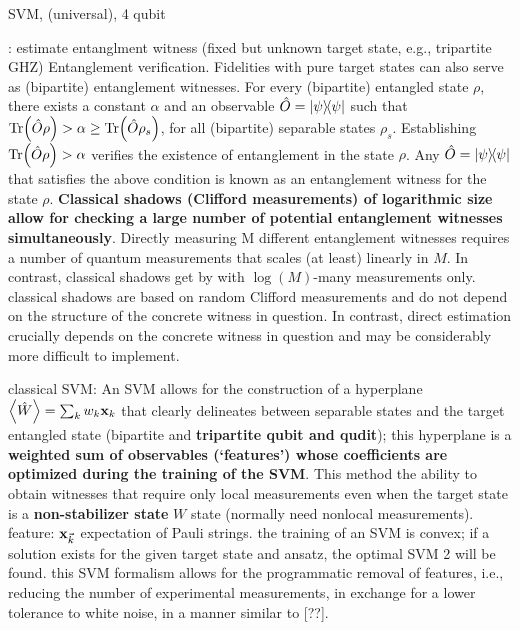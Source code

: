 \documentclass[
10pt,
aps,
pra,
linenumbers,
floatfix,
]{revtex4-2}
\theoremstyle{plain}
\theoremstyle{definition}
\newcommand{\ew}{\hat{W}}
\newcommand{\ob}{\hat{O}}
\newcommand{\dm}{\rho}
\begin{document}
SVM, (universal), 4 qubit \cite{vintskevichClassificationFourqubitEntangled2022}

{} \cite{huangPredictingManyProperties2020}: estimate entanglment witness (fixed but unknown target state, e.g., tripartite GHZ)
Entanglement verification. Fidelities with pure target states can also serve as (bipartite) entanglement witnesses. For every (bipartite) entangled state $\dm$, there exists a constant $\alpha$ and an observable $\ob = \op{\psi}$ such that $\Tr(\ob \dm ) > \alpha \ge \Tr(\ob \dm_s )$, for all (bipartite) separable states $\dm_s$. Establishing $\Tr(\ob \dm ) > \alpha$ verifies the existence of entanglement in the state $\dm$. Any $\ob = \op{\psi}$ that satisfies the above condition is known as an entanglement witness for the state $\dm$. 
\textbf{Classical shadows (Clifford measurements) of logarithmic size allow for checking a large number of potential entanglement witnesses simultaneously}.
Directly measuring M diﬀerent entanglement witnesses requires a number of quantum measurements that scales (at least) linearly in $M$. In contrast, classical shadows get by with $\log(M)$-many measurements only.
classical shadows are based on random Clifford measurements and do not depend on the structure of the concrete witness in question. In contrast, direct estimation crucially depends on the concrete witness in question and may be considerably more diﬃcult to implement.

classical SVM: An SVM allows for the construction of a hyperplane $\expval{\ew}=\sum_k w_k \vbx_{k}$ that clearly delineates between separable states and the target entangled state (bipartite and \textbf{tripartite qubit and qudit}); this hyperplane is a \textbf{weighted sum of observables (`features') whose coefficients are optimized during the training of the SVM}.
This method the ability to obtain witnesses that require only local measurements even when the target state is a \textbf{non-stabilizer state} $W$ state (normally need nonlocal measurements).
feature: $\vb{x}_{\vec{k}}$ expectation of Pauli strings.
the training of an SVM is convex; if a solution exists for the given target state and ansatz, the optimal SVM 2 will be found.
this SVM formalism allows for the programmatic removal of features, i.e., reducing the number of experimental measurements, in exchange for a lower tolerance to white noise, in a manner similar to [??].
\end{document}

